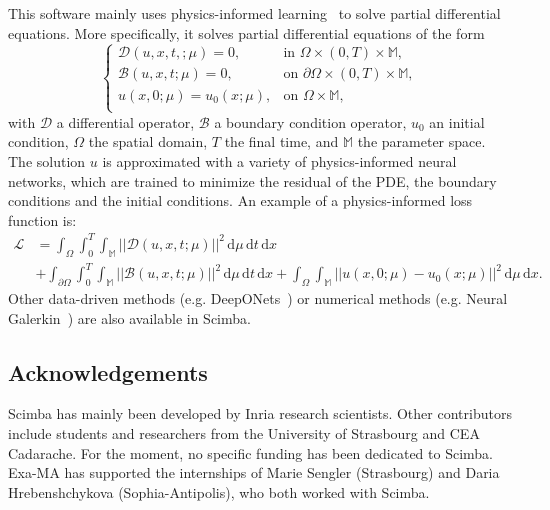 This software mainly uses physics-informed
learning~\cite{KarKevLuPerWanYan2021}
to solve partial differential equations.
More specifically, it solves partial differential equations of the form
\begin{equation*}
    \begin{cases}
        \mathcal{D}(u, x, t,; \mu) = 0,
         & \text{in } \Omega \times (0,T) \times \mathbb{M},          \\
        \mathcal{B}(u, x, t; \mu) = 0,
         & \text{on } \partial \Omega \times (0,T) \times \mathbb{M}, \\
        u(x, 0; \mu) = u_0(x; \mu),
         & \text{on } \Omega \times \mathbb{M},                       \\
    \end{cases}
\end{equation*}
with $\mathcal{D}$ a differential operator, $\mathcal{B}$ a boundary condition operator,
$u_0$ an initial condition, $\Omega$ the spatial domain,
$T$ the final time, and $\mathbb{M}$ the parameter space.
The solution $u$ is approximated with a variety of physics-informed neural networks,
which are trained to minimize the residual of the PDE,
the boundary conditions and the initial conditions.
An example of a physics-informed loss function is:
\begin{equation*}
    \begin{aligned}
        \mathcal{L} & =
        \int_\Omega \int_0^T \int_{\mathbb{M}}
        ||\mathcal{D}(u, x, t; \mu)||^2 \,
        \mathrm{d}\mu \, \mathrm{d}t \, \mathrm{d}x \\
                    & +
        \int_{\partial\Omega} \int_0^T \int_{\mathbb{M}}
        ||\mathcal{B}(u, x, t; \mu)||^2 \,
        \mathrm{d}\mu \, \mathrm{d}t \, \mathrm{d}x
        +
        \int_{\Omega} \int_{\mathbb{M}}
        ||u(x, 0; \mu) - u_0(x;\mu)||^2 \,
        \mathrm{d}\mu \, \mathrm{d}x.
    \end{aligned}
\end{equation*}
Other data-driven methods
(e.g. DeepONets~\cite{LuJinPanZhoKar2021})
or numerical methods
(e.g. Neural Galerkin~\cite{BruPehVan2024})
are also available in Scimba.




\subsection{Acknowledgements}
\label{sec::Scimba:acknowledgements}

Scimba has mainly been developed by Inria research scientists.
Other contributors include students and researchers
from the University of Strasbourg and CEA Cadarache.
For the moment, no specific funding has been dedicated to Scimba.
Exa-MA has supported the internships of Marie Sengler (Strasbourg) and Daria Hrebenshchykova (Sophia-Antipolis), who both worked with Scimba.

